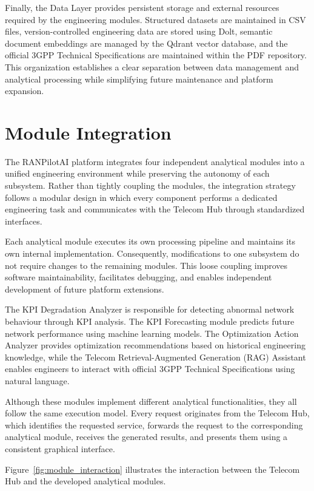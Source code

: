 Finally, the Data Layer provides persistent storage and external resources required by the engineering modules. Structured datasets are maintained in CSV files, version-controlled engineering data are stored using Dolt, semantic document embeddings are managed by the Qdrant vector database, and the official 3GPP Technical Specifications are maintained within the PDF repository. This organization establishes a clear separation between data management and analytical processing while simplifying future maintenance and platform expansion.
\section{Module Integration}

The RANPilotAI platform integrates four independent analytical modules into a unified engineering environment while preserving the autonomy of each subsystem. Rather than tightly coupling the modules, the integration strategy follows a modular design in which every component performs a dedicated engineering task and communicates with the Telecom Hub through standardized interfaces.

Each analytical module executes its own processing pipeline and maintains its own internal implementation. Consequently, modifications to one subsystem do not require changes to the remaining modules. This loose coupling improves software maintainability, facilitates debugging, and enables independent development of future platform extensions.

The KPI Degradation Analyzer is responsible for detecting abnormal network behaviour through KPI analysis. The KPI Forecasting module predicts future network performance using machine learning models. The Optimization Action Analyzer provides optimization recommendations based on historical engineering knowledge, while the Telecom Retrieval-Augmented Generation (RAG) Assistant enables engineers to interact with official 3GPP Technical Specifications using natural language.

Although these modules implement different analytical functionalities, they all follow the same execution model. Every request originates from the Telecom Hub, which identifies the requested service, forwards the request to the corresponding analytical module, receives the generated results, and presents them using a consistent graphical interface.

Figure~\ref{fig:module_interaction} illustrates the interaction between the Telecom Hub and the developed analytical modules.

